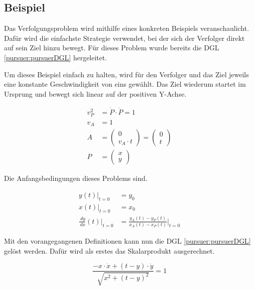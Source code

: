 \subsection{Beispiel}
Das Verfolgungsproblem wird mithilfe eines konkreten Beispiels veranschaulicht. Dafür wird die einfachste Strategie verwendet, bei der sich der Verfolger direkt auf sein Ziel hinzu bewegt. Für dieses Problem wurde bereits die DGL \eqref{pursuer:pursuerDGL} hergeleitet.

Um dieses Beispiel einfach zu halten, wird für den Verfolger und das Ziel jeweils eine konstante Geschwindigkeit von eins gewählt. Das Ziel wiederum startet im Ursprung und bewegt sich linear auf der positiven Y-Achse.

\begin{align}
    v_P^2
    &=
    \dot{P}\cdot\dot{P}
    =
    1
    \\[5pt]
    v_A
    &=
    1
    \\[5pt]
    A
    &=
    \begin{pmatrix}
    	0 \\
    	v_A\cdot t
    \end{pmatrix}
	=
	\begin{pmatrix}
		0 \\
		t
	\end{pmatrix}
	\\[5pt]
	P
	&=
	\begin{pmatrix}
		x \\
		y
	\end{pmatrix}
\end{align}

Die Anfangsbedingungen dieses Problems sind.

\begin{align}
	y(t)\bigg|_{t=0}
	&=
	y_0
	\\[5pt]
	x(t)\bigg|_{t=0}
	&=
	x_0 \\[5pt]
	\frac{\,dy}{\,dx}(t)\bigg|_{t=0}
	&=
	\frac{y_A(t) -y_P(t)}{x_A(t)-x_P(t)}\bigg|_{t=0}
\end{align}

Mit den vorangegangenen Definitionen kann nun die DGL \eqref{pursuer:pursuerDGL} gelöst werden.
Dafür wird als erstes das Skalarprodukt ausgerechnet.

\begin{equation}
	\dfrac{-x\cdot\dot{x}+(t-y)\cdot\dot{y}}{\sqrt{x^2+(t-y)^2}} = 1
\end{equation}










